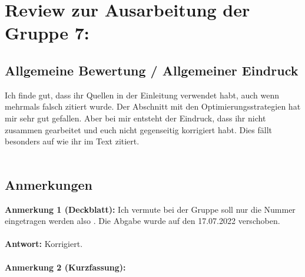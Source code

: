 \documentclass[a4paper,12pt]{book}
\begin{document}
\chapter*{Review zur Ausarbeitung der Gruppe 7:}
\section*{Allgemeine Bewertung / Allgemeiner Eindruck}
Ich finde gut, dass ihr Quellen in der Einleitung verwendet habt, auch wenn mehrmals falsch zitiert wurde. 
Der Abschnitt mit den Optimierungsstrategien hat mir sehr gut gefallen.
Aber bei mir entsteht der Eindruck, dass ihr nicht zusammen gearbeitet und euch nicht gegenseitig korrigiert habt. Dies fällt besonders auf wie ihr im Text zitiert. 
\\ \\
\section*{Anmerkungen}
\textbf{Anmerkung 1 (Deckblatt):}
Ich vermute bei der Gruppe soll nur die Nummer eingetragen werden also \grqq.
Die Abgabe wurde auf den 17.07.2022 verschoben.
\\ \\
\textbf{Antwort:}
Korrigiert.
\\ \\
\textbf{Anmerkung 2 (Kurzfassung):} 
\end{document}
